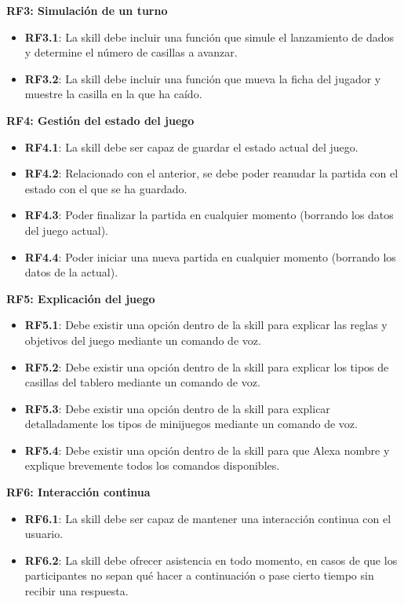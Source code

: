 \textbf{RF3: Simulación de un turno}
\begin{itemize}
    \item \textbf{RF3.1}: La skill debe incluir una función que simule el lanzamiento de dados y determine el número de casillas a avanzar.
    \item \textbf{RF3.2}: La skill debe incluir una función que mueva la ficha del jugador y muestre la casilla en la que ha caído.
\end{itemize}

\textbf{RF4: Gestión del estado del juego}
\begin{itemize}
    \item \textbf{RF4.1}: La skill debe ser capaz de guardar el estado actual del juego.
    \item \textbf{RF4.2}: Relacionado con el anterior, se debe poder reanudar la partida con el estado con el que se ha guardado.
    \item \textbf{RF4.3}: Poder finalizar la partida en cualquier momento (borrando los datos del juego actual).
    \item \textbf{RF4.4}: Poder iniciar una nueva partida en cualquier momento (borrando los datos de la actual).
\end{itemize}

\textbf{RF5: Explicación del juego}
\begin{itemize}
    \item \textbf{RF5.1}: Debe existir una opción dentro de la skill para explicar las reglas y objetivos del juego mediante un comando de voz.
    \item \textbf{RF5.2}: Debe existir una opción dentro de la skill para explicar los tipos de casillas del tablero mediante un comando de voz.
    \item \textbf{RF5.3}: Debe existir una opción dentro de la skill para explicar detalladamente los tipos de minijuegos mediante un comando de voz.
    \item \textbf{RF5.4}: Debe existir una opción dentro de la skill para que Alexa nombre y explique brevemente todos los comandos disponibles.
\end{itemize}

\textbf{RF6: Interacción continua}
\begin{itemize}
	\item \textbf{RF6.1}: La skill debe ser capaz de mantener una interacción continua con el usuario.
    \item \textbf{RF6.2}: La skill debe ofrecer asistencia en todo momento, en casos de que los participantes no sepan qué hacer a continuación o pase cierto tiempo sin recibir una respuesta.
\end{itemize}

